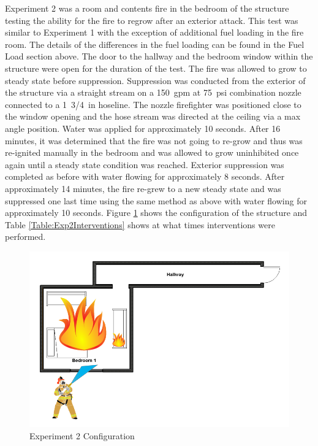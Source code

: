 \documentclass[12pt,oneside]{book}
\begin{document}
Experiment 2 was a room and contents fire in the bedroom of the structure testing the ability for the fire to regrow after an exterior attack. This test was similar to Experiment 1 with the exception of additional fuel loading in the fire room. The details of the differences in the fuel loading can be found in the Fuel Load section above. The door to the hallway and the bedroom window within the structure were open for the duration of the test. The fire was allowed to grow to steady state before suppression. Suppression was conducted from the exterior of the structure via a straight stream on a 150~gpm at 75~psi combination nozzle connected to a 1~3/4~in hoseline. The nozzle firefighter was positioned close to the window opening and the hose stream was directed at the ceiling via a max angle position. Water was applied for approximately 10 seconds. After 16 minutes, it was determined that the fire was not going to re-grow and thus was re-ignited manually in the bedroom and was allowed to grow uninhibited once again until a steady state condition was reached. Exterior suppression was completed as before with water flowing for approximately 8 seconds. After approximately 14 minutes, the fire re-grew to a new steady state and was suppressed one last time using the same method as above with water flowing for approximately 10 seconds. Figure \ref{fig:Exp2Config} shows the configuration of the structure and Table \ref{Table:Exp2Interventions} shows at what times interventions were performed.  


\begin{figure}[H]
	\centering
	\includegraphics[width=5in]{Howard_Exp_2.png}
	\caption{Experiment 2 Configuration}
	\label{fig:Exp2Config}
\end{figure}
\end{document}
